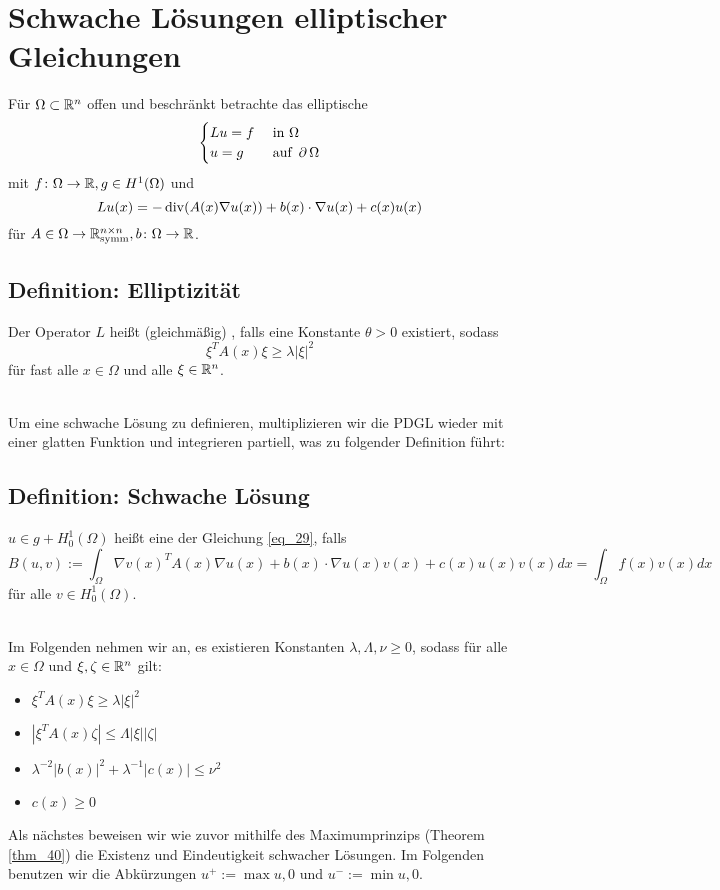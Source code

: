 \section{Schwache Lösungen elliptischer Gleichungen}
\label{sec:para9}
	Für $\Omega \subset \mathbb{R}^n$ offen und beschränkt betrachte das elliptische  
	\begin{equation}
		\begin{cases}
			Lu = f	& \text{ in } \Omega \\
			u = g	& \text{ auf } \operatorname{\partial} \Omega
		\end{cases} \label{eq_29}
	\end{equation}
	mit $f\colon \Omega \rightarrow \mathbb{R}, g \in H^1(\Omega)$ und
	\[ Lu(x) = -\operatorname{div} (A(x) \nabla u(x)) + b(x) \cdot \nabla u(x) + c(x) u(x) \]
	für $A \in \Omega \rightarrow \mathbb{R}_{\text{symm}}^{n\times n}, b\colon \Omega \rightarrow \mathbb{R}$.
	
\subsection{Definition: Elliptizität}
\label{def_64} 
	Der Operator $L$ heißt (gleichmäßig) , falls eine Konstante $\theta > 0$ existiert, sodass \marginnote{[64]}
	\[ \xi^T A(x) \xi \geq \lambda |\xi|^2 \]
	für fast alle $x \in \Omega$ und alle $\xi \in \mathbb{R}^n$.
	
\mbox{} \\
Um eine schwache Lösung zu definieren, multiplizieren wir die PDGL wieder mit einer glatten Funktion und integrieren partiell, was zu folgender Definition führt:

\subsection{Definition: Schwache Lösung}
\label{def_65}
	$u \in g+ H_0^1(\Omega)$ heißt eine  der Gleichung \eqref{eq_29}, falls \marginnote{[65]}
	\begin{equation}
		B(u,v) := \int_{\Omega} \nabla v(x)^T A(x) \nabla u(x) + b(x) \cdot \nabla u(x) v(x) + c(x) u(x) v(x) dx = \int_\Omega f(x) v(x) dx \label{eq_30}
	\end{equation}
	für alle $v \in H_0^1(\Omega)$.
	
\mbox{} \\
Im Folgenden nehmen wir an, es existieren Konstanten $\lambda, \Lambda, \nu \geq 0$, sodass für alle $x \in \Omega$ und $\xi,\zeta \in \mathbb{R}^n$ gilt:
\begin{itemize}
	\item $\xi^T A(x) \xi \geq \lambda |\xi|^2$
	\item $|\xi^T A(x) \zeta| \leq \Lambda |\xi| |\zeta|$
	\item $\lambda^{-2} |b(x)|^2 + \lambda^{-1}|c(x)| \leq \nu^2$
	\item $c(x) \geq 0$
\end{itemize}
Als nächstes beweisen wir wie zuvor mithilfe des Maximumprinzips (Theorem \ref{thm_40}) die Existenz und Eindeutigkeit schwacher Lösungen. Im Folgenden benutzen wir die Abkürzungen $u^+ := \max{u,0}$ und $u^- := \min{u,0}$.


